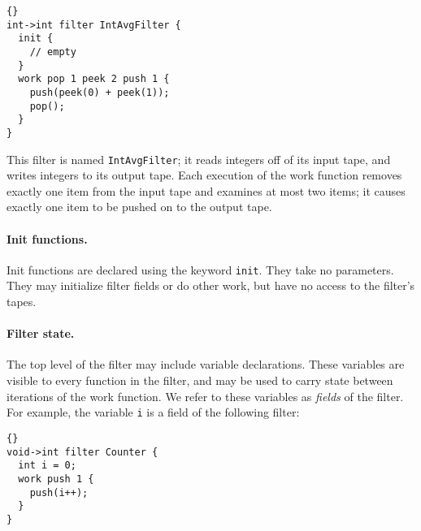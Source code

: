 \documentclass[11pt]{article}
\begin{document}
\begin{lstlisting}{}
int->int filter IntAvgFilter {
  init {
    // empty
  }
  work pop 1 peek 2 push 1 {
    push(peek(0) + peek(1));
    pop();
  }
}
\end{lstlisting}

This filter is named \lstinline|IntAvgFilter|; it reads integers off of its
input tape, and writes integers to its output tape.  Each execution of
the work function removes exactly one item from the input tape and
examines at most two items; it causes exactly one item to be pushed on
to the output tape.




\paragraph{Init functions.}  Init functions are declared using the
keyword \lstinline|init|.  They take no parameters.  They may initialize
filter fields or do other work, but have no access to the filter's
tapes.

\paragraph{Filter state.}  The top level of the filter may include
variable declarations.  These variables are visible to every function
in the filter, and may be used to carry state between iterations of
the work function.  We refer to these variables as {\it fields}
of the filter.  For example, the variable \lstinline|i| is a field of
the following filter:
\begin{lstlisting}{}
void->int filter Counter {
  int i = 0;
  work push 1 {
    push(i++);
  }
}
\end{lstlisting}{}
\end{document}
